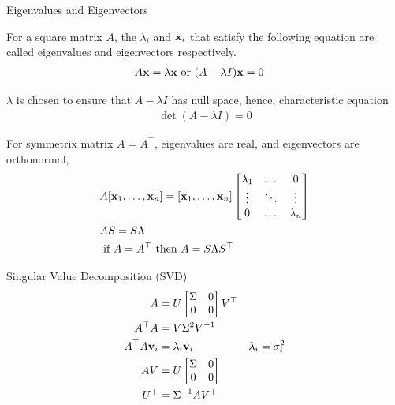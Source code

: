 \documentclass[times,t]{beamer}
\begin{document}
\begin{frame}{Eigenvalues  and Eigenvectors}

For a  square  matrix $A$, the $\lambda_i$ and  $\mathbf{x}_i$ that satisfy  the
following equation are called eigenvalues and  eigenvectors  respectively.
\begin{align}
  A  \mathbf{x} &= \lambda \mathbf{x} \text{ or } (A  - \lambda I)\mathbf{x}  = 0
\end{align}

$\lambda$ is   chosen to ensure  that   $A  -  \lambda I$  has null space,
hence, characteristic   equation
\begin{align}
  \det(A  - \lambda I) = 0 
 \end{align}

 For  symmetrix matrix $A =  A^\top$, eigenvalues  are  real, and eigenvectors
 are orthonormal,
 \begin{align}
   &A[\mathbf{x}_1, \dots,   \mathbf{x}_n]  = [\mathbf{x}_1, \dots,   \mathbf{x}_n]\begin{bmatrix}\lambda_1 &   \dots   &  0 \\
     \vdots   &   \ddots &  \vdots \\
   0 &   \dots  &  \lambda_n \end{bmatrix}
                  \\
   &A  S = S  \Lambda
   \\
   &\text{  if   }  A =  A^\top \text{ then   }  A   = S \Lambda S^\top
   \end{align}


\end{frame}

\begin{frame}{Singular Value  Decomposition (SVD)}
  \begin{align}
    A  &=   U  \begin{bmatrix}\Sigma   &  0  \\   0  &  0 \end{bmatrix} V^\top \\
    A^\top A &= V \Sigma^2  V^{-1} \\
    A^\top A \mathbf{v}_i  &= \lambda_i \mathbf{v}_i & \lambda_i = \sigma_i^2\\
    A V   &= U \begin{bmatrix}\Sigma   &  0  \\   0  &  0 \end{bmatrix}\\
    U^+   &=  \Sigma^{-1}AV^+
    \end{align}
\end{frame}
\end{document}
